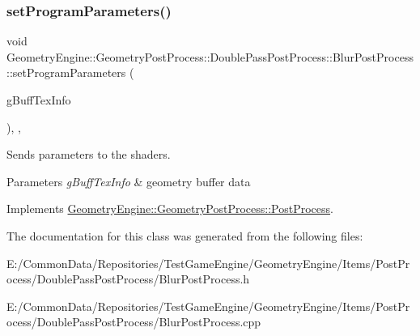 \subsubsection{\texorpdfstring{setProgramParameters()}{setProgramParameters()}}
{\footnotesize\ttfamily void Geometry\+Engine\+::\+Geometry\+Post\+Process\+::\+Double\+Pass\+Post\+Process\+::\+Blur\+Post\+Process\+::set\+Program\+Parameters (\begin{DoxyParamCaption}\item[{const \mbox{\hyperlink{class_geometry_engine_1_1_g_buffer_texture_info}{G\+Buffer\+Texture\+Info}} \&}]{g\+Buff\+Tex\+Info }\end{DoxyParamCaption})\hspace{0.3cm}{\ttfamily [override]}, {\ttfamily [protected]}, {\ttfamily [virtual]}}

Sends parameters to the shaders. 
\begin{DoxyParams}{Parameters}
{\em g\+Buff\+Tex\+Info} & geometry buffer data \\
\hline
\end{DoxyParams}


Implements \mbox{\hyperlink{class_geometry_engine_1_1_geometry_post_process_1_1_post_process_ae4bd80f5d0f0768fd4e2141a95ff5bb0}{Geometry\+Engine\+::\+Geometry\+Post\+Process\+::\+Post\+Process}}.



The documentation for this class was generated from the following files\+:\begin{DoxyCompactItemize}
\item 
E\+:/\+Common\+Data/\+Repositories/\+Test\+Game\+Engine/\+Geometry\+Engine/\+Items/\+Post\+Process/\+Double\+Pass\+Post\+Process/Blur\+Post\+Process.\+h\item 
E\+:/\+Common\+Data/\+Repositories/\+Test\+Game\+Engine/\+Geometry\+Engine/\+Items/\+Post\+Process/\+Double\+Pass\+Post\+Process/Blur\+Post\+Process.\+cpp\end{DoxyCompactItemize}
